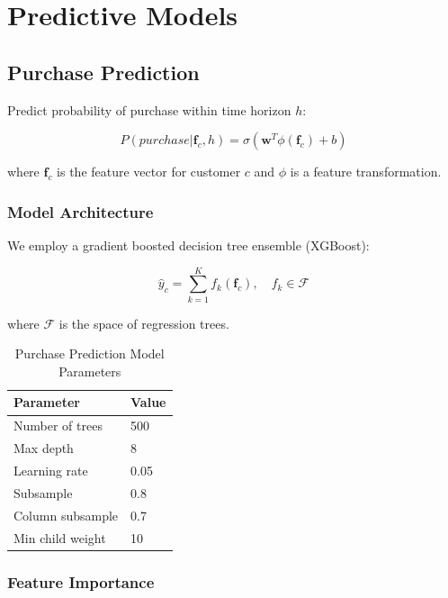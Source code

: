 \section{Predictive Models}


\subsection{Purchase Prediction}

Predict probability of purchase within time horizon $h$:

\begin{equation}
P(purchase | \mathbf{f}_c, h) = \sigma(\mathbf{w}^T \phi(\mathbf{f}_c) + b)
\end{equation}

where $\mathbf{f}_c$ is the feature vector for customer $c$ and $\phi$ is a feature transformation.

\subsubsection{Model Architecture}

We employ a gradient boosted decision tree ensemble (XGBoost):

\begin{equation}
\hat{y}_c = \sum_{k=1}^{K} f_k(\mathbf{f}_c), \quad f_k \in \mathcal{F}
\end{equation}

where $\mathcal{F}$ is the space of regression trees.

\begin{table}[h]
\centering
\caption{Purchase Prediction Model Parameters}
\begin{tabular}{ll}
\toprule
\textbf{Parameter} & \textbf{Value} \\
\midrule
Number of trees & 500 \\
Max depth & 8 \\
Learning rate & 0.05 \\
Subsample & 0.8 \\
Column subsample & 0.7 \\
Min child weight & 10 \\
\bottomrule
\end{tabular}
\end{table}

\subsubsection{Feature Importance}

